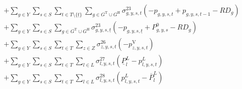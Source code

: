 \documentclass{article}
\newcommand{\sGeneratorsThermal}{G^{\mathrm{T}}}
\newcommand{\sGeneratorsHydro}{G^{\mathrm{H}}}
\newcommand{\sStorage}{G^{\mathrm{Q}}}
\newcommand{\sYears}{Y}
\newcommand{\sScenarios}{S}
\newcommand{\sIntervals}{T}
\newcommand{\sZones}{Z}
\newcommand{\sLinks}{L}
\newcommand{\iGenerator}{g}
\newcommand{\iYear}{y}
\newcommand{\iScenario}{s}
\newcommand{\iInterval}{t}
\newcommand{\iIntervalStart}{\underline{\iInterval}}
\newcommand{\iZone}{z}
\newcommand{\iLink}{l}
\newcommand{\cRampRateDown}[1][\iGenerator]{RD_{#1}}
\newcommand{\cPowerFlowMin}{\underline{P}_{\iLink}^{L}}
\newcommand{\cPowerFlowMax}{\overline{P}_{\iLink}^{L}}
\newcommand{\cPowerInitial}[1][\iGenerator,\iYear,\iScenario]{P_{#1}^{0}}
\newcommand{\cPowerOutInitial}[1][\iGenerator,\iYear,\iScenario]{\hat{P}_{#1}^{\mathrm{out}}}
\newcommand{\cPowerInInitial}[1][\iGenerator,\iYear,\iScenario]{\hat{P}_{#1}^{\mathrm{in}}}
\newcommand{\vPower}[1][\iGenerator,\iYear,\iScenario,\iInterval]{p_{#1}}
\newcommand{\vPowerIn}[1][\iGenerator,\iYear,\iScenario,\iInterval]{p^{\mathrm{in}}_{#1}}
\newcommand{\vPowerOut}[1][\iGenerator,\iYear,\iScenario,\iInterval]{p^{\mathrm{out}}_{#1}}
\newcommand{\vPowerFlow}[1][\iLink,\iYear,\iScenario,\iInterval]{p^{\sLinks}_{#1}}
\newcommand{\vLostLoadPower}[1][\iZone,\iYear,\iScenario,\iInterval]{p^{\mathrm{V}}_{#1}}
\newcommand{\dRampRateDown}[1][\iGenerator,\iYear,\iScenario,\iInterval]{\sigma_{#1}^{23}}
\newcommand{\dRampRateDownStorageCharging}[1][\iGenerator,\iYear,\iScenario,\iInterval]{\sigma_{#1}^{24}}
\newcommand{\dRampRateDownStorageDischarging}[1][\iGenerator,\iYear,\iScenario,\iInterval]{\sigma_{#1}^{25}}
\newcommand{\dNonNegativeLostLoad}[1][\iZone,\iYear,\iScenario,\iInterval]{\sigma_{#1}^{26}}
\newcommand{\dMinPowerFlow}[1][\iLink,\iYear,\iScenario,\iInterval]{\sigma_{#1}^{27}}
\newcommand{\dMaxPowerFlow}[1][\iLink,\iYear,\iScenario,\iInterval]{\sigma_{#1}^{28}}
\begin{document}
\begin{align}
		& + \sum\limits_{\iYear \in \sYears}\sum\limits_{\iScenario \in \sScenarios}\sum\limits_{\iInterval \in \sIntervals \setminus \{\iIntervalStart\}} \sum\limits_{\iGenerator \in \sGeneratorsThermal \cup \sGeneratorsHydro} \dRampRateDown \left(- \vPower + \vPower[\iGenerator,\iYear,\iScenario,\iInterval-1] - \cRampRateDown\right)\\
		& + \sum\limits_{\iYear \in \sYears}\sum\limits_{\iScenario \in \sScenarios} \sum\limits_{\iGenerator \in \sGeneratorsThermal \cup \sGeneratorsHydro} \dRampRateDown[\iGenerator,\iYear,\iScenario,\iIntervalStart] \left(- \vPower[\iGenerator,\iYear,\iScenario,\iIntervalStart] + \cPowerInitial - \cRampRateDown\right)\\
		& + \sum\limits_{\iYear \in \sYears}\sum\limits_{\iScenario \in \sScenarios}\sum\limits_{\iInterval \in \sIntervals} \sum\limits_{\iZone \in \sZones} \dNonNegativeLostLoad \left(- \vLostLoadPower\right)\\
		& + \sum\limits_{\iYear \in \sYears}\sum\limits_{\iScenario \in \sScenarios}\sum\limits_{\iInterval \in \sIntervals} \sum\limits_{\iLink \in \sLinks} \dMinPowerFlow \left(\cPowerFlowMin - \vPowerFlow\right)\\
		& + \sum\limits_{\iYear \in \sYears}\sum\limits_{\iScenario \in \sScenarios}\sum\limits_{\iInterval \in \sIntervals} \sum\limits_{\iLink \in \sLinks} \dMaxPowerFlow \left(\vPowerFlow - \cPowerFlowMax\right)\\\nonumber
\end{align}
\end{document}
